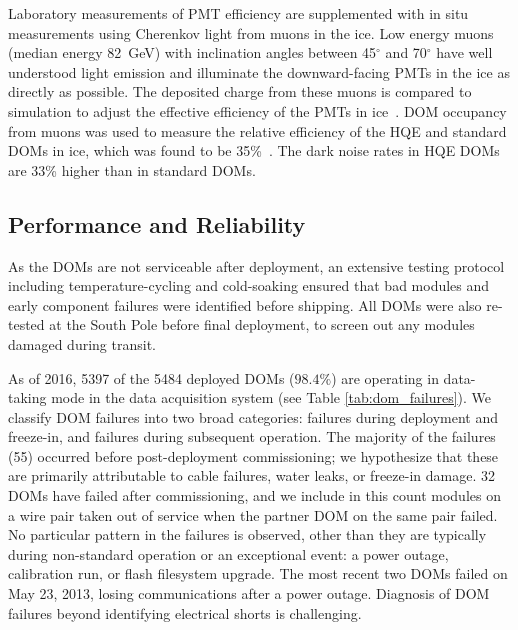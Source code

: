 Laboratory measurements of PMT efficiency are supplemented with in situ measurements using Cherenkov light from muons in the ice. Low energy muons (median energy 82~GeV) with inclination angles between 45$^{\circ}$ and 70$^{\circ}$ have well understood light emission and illuminate the downward-facing PMTs in the ice as directly as possible. The deposited charge from these muons is compared to simulation to adjust the effective efficiency of the PMTs in ice~\cite{IC3:ereco}. DOM occupancy from muons was used to measure the relative efficiency of the HQE and standard DOMs in ice, which was found to be 35\%~\cite{ICECUBE:DC}. The dark noise rates in HQE DOMs are 33\% higher than in standard DOMs.


\subsection{Performance and Reliability}

As the DOMs are not serviceable after deployment, an extensive testing
protocol including temperature-cycling and cold-soaking ensured that bad
modules and early component failures were identified before shipping.
All DOMs were also re-tested at the South Pole before final deployment, to
screen out any modules damaged during transit.

As of 2016, 5397 of the 5484 deployed DOMs ($98.4\%$) are operating in
data-taking mode in the data acquisition system (see Table
\ref{tab:dom_failures}).  We classify DOM 
failures into two broad categories: failures during deployment and
freeze-in, and failures during subsequent operation.  The majority of the
failures (55) occurred before post-deployment commissioning; we hypothesize
that these are primarily attributable to cable failures, water leaks,
or freeze-in damage. 32 DOMs have failed after commissioning, and
we include in this count modules on a wire pair taken out of service when
the partner DOM on the same pair failed.  No particular pattern in the
failures is observed, other than they are typically during non-standard
operation or an exceptional event: a power outage, calibration run, or
flash filesystem upgrade.  The most recent two DOMs failed on May 23, 2013,
losing communications after a power outage.  Diagnosis of DOM failures
beyond identifying electrical shorts is challenging.


